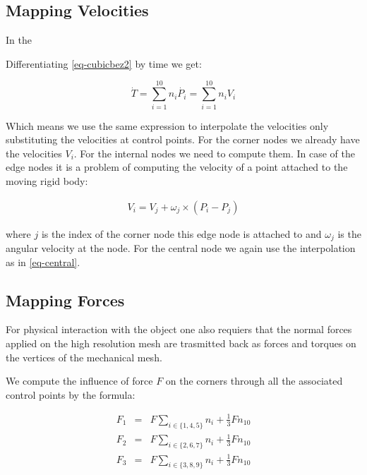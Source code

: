 \documentclass{egpubl}
\begin{document}
\subsection{Mapping Velocities}

In the 

Differentiating \eqref{eq-cubicbez2} by time we get:

\begin{equation}
    \dot{T} = \sum_{i=1}^{10} n_i \dot{P_i} = \sum_{i=1}^{10} n_i V_i
\end{equation}

Which means we use the same expression to interpolate the velocities only
substituting the velocities at control points. For the corner nodes we
already have the velocities $V_i$. For the internal nodes we need to compute
them. In case of the edge nodes it is a problem of computing the velocity
of a point attached to the moving rigid body:

\begin{eqnarray}
    V_i = V_j + \omega_j \times (P_i - P_j)
\end{eqnarray}

where $j$ is the index of the corner node this edge node is attached to and
$\omega_j$ is the angular velocity at the node. For the central node we
again use the interpolation as in \eqref{eq-central}.

\subsection{Mapping Forces}

For physical interaction with the object one also requiers that the normal
forces applied on the high resolution mesh are trasmitted back as forces
and torques on the vertices of the mechanical mesh.

We compute the influence of force $F$ on the corners through all the
associated control points by the formula:

\begin{eqnarray}
    F_1 & = & F \sum_{i \in \{1,4,5\}} n_i + \frac{1}{3} F n_{10} \\
    F_2 & = & F \sum_{i \in \{2,6,7\}} n_i + \frac{1}{3} F n_{10} \\
    F_3 & = & F \sum_{i \in \{3,8,9\}} n_i + \frac{1}{3} F n_{10} \\
\end{eqnarray}

\end{document}

